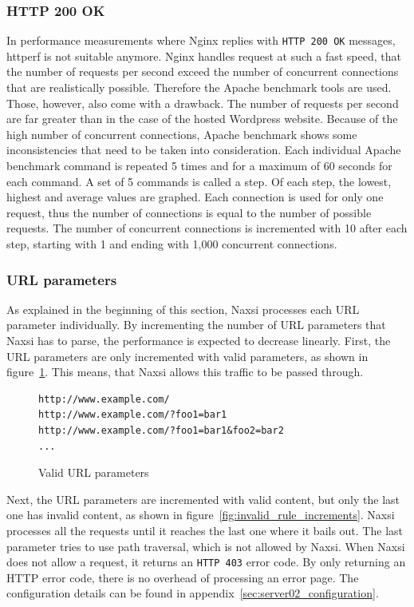 \documentclass[Methods]{subfiles}
\begin{document}
\subsubsection{HTTP 200 OK}
\label{sec:HTTP 200 OK}
In performance measurements where Nginx replies with \verb+HTTP 200 OK+ messages, httperf is not suitable anymore. Nginx handles request at such a fast speed, that the number of requests per second exceed the number of concurrent connections that are realistically possible. Therefore the Apache benchmark tools are used. Those, however, also come with a drawback. The number of requests per second are far greater than in the case of the hosted Wordpress website. Because of the high number of concurrent connections, Apache benchmark shows some inconsistencies that need to be taken into consideration. Each individual Apache benchmark command is repeated 5 times and for a maximum of 60 seconds for each command. A set of 5 commands is called a step. Of each step, the lowest, highest and average values are graphed. Each connection is used for only one request, thus the number of connections is equal to the number of possible requests. The number of concurrent connections is incremented with 10 after each step, starting with 1 and ending with 1,000 concurrent connections.

\subsubsection{URL parameters}
As explained in the beginning of this section, Naxsi processes each \ac{URL} parameter individually. By incrementing the number of \ac{URL} parameters that Naxsi has to parse, the performance is expected to decrease linearly. First, the \ac{URL} parameters are only incremented with valid parameters, as shown in figure~\ref{fig:valid_rule_increments}. This means, that Naxsi allows this traffic to be passed through. 

\begin{figure}[H]
\caption{Valid URL parameters}
\begin{verbatim}
http://www.example.com/
http://www.example.com/?foo1=bar1
http://www.example.com/?foo1=bar1&foo2=bar2
...
\end{verbatim}
\label{fig:valid_rule_increments}
\end{figure}

Next, the \ac{URL} parameters are incremented with valid content, but only the last one has invalid content, as shown in figure~\ref{fig:invalid_rule_increments}. Naxsi processes all the requests until it reaches the last one where it bails out. The last parameter tries to use path traversal, which is not allowed by Naxsi. When Naxsi does not allow a request, it returns an \verb+HTTP 403+ error code. By only returning an HTTP error code, there is no overhead of processing an error page. The configuration details can be found in appendix~\ref{sec:server02_configuration}.
\end{document}
